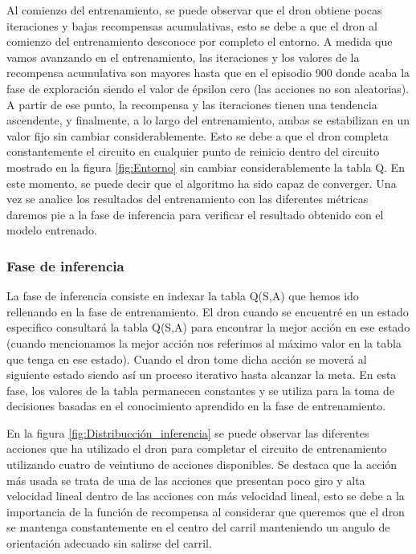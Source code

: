 Al comienzo del entrenamiento, se puede observar que el dron obtiene pocas iteraciones y bajas recompensas acumulativas, 
esto se debe a que el dron al comienzo del entrenamiento desconoce por completo el entorno. A medida que vamos avanzando en el entrenamiento, 
las iteraciones y los valores de la recompensa acumulativa son mayores hasta que en el episodio 900 donde acaba la fase de exploración 
siendo el valor de épsilon cero (las acciones no son aleatorias). A partir de ese punto, la recompensa y las iteraciones tienen una tendencia ascendente, y finalmente, 
a lo largo del entrenamiento, ambas se estabilizan en un valor fijo sin cambiar considerablemente. Esto se debe a que el dron completa constantemente el circuito en cualquier
punto de reinicio dentro del circuito mostrado en la figura \ref{fig:Entorno} sin cambiar considerablemente la tabla Q. En este momento, se puede decir que el algoritmo ha sido capaz de converger. Una vez se analice 
los resultados del entrenamiento con las diferentes métricas daremos pie a la fase de inferencia para verificar el resultado obtenido con el modelo entrenado. 

\subsubsection{Fase de inferencia}
\label{sec:fases_inferencia}
La fase de inferencia consiste en indexar la tabla Q(S,A) que hemos ido rellenando en la fase de entrenamiento. El dron cuando se encuentré en un estado especifico consultará la tabla Q(S,A) para
encontrar la mejor acción en ese estado (cuando mencionamos la mejor acción nos referimos al máximo valor en la tabla que tenga en ese estado). Cuando el dron tome dicha acción se moverá al siguiente estado
siendo así un proceso iterativo hasta alcanzar la meta. En esta fase, los valores de la tabla permanecen constantes y se utiliza para la toma de decisiones basadas en el conocimiento
aprendido en la fase de entrenamiento. \newline

En la figura \ref{fig:Distribucción_inferencia} se puede observar las diferentes acciones que ha utilizado el dron para completar el circuito de entrenamiento utilizando cuatro de veintiuno de acciones
disponibles. Se destaca que la acción más usada se trata de una de las acciones que presentan poco giro y alta velocidad lineal dentro de las acciones con más velocidad lineal, esto se debe
a la importancia de la función de recompensa al considerar que queremos que el dron se mantenga constantemente en el centro del carril manteniendo un angulo de orientación adecuado
sin salirse del carril.

